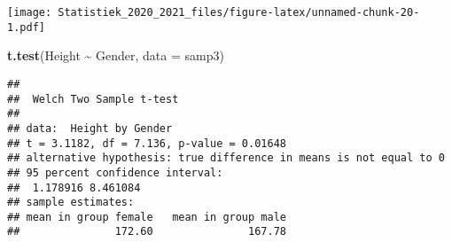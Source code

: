\documentclass[
  12pt,dutch,coursenotes]{book}
\newenvironment{Shaded}{\begin{snugshade}}{\end{snugshade}}
\newcommand{\DataTypeTok}[1]{\textcolor[rgb]{0.13,0.29,0.53}{#1}}
\newcommand{\DecValTok}[1]{\textcolor[rgb]{0.00,0.00,0.81}{#1}}
\newcommand{\KeywordTok}[1]{\textcolor[rgb]{0.13,0.29,0.53}{\textbf{#1}}}
\newcommand{\NormalTok}[1]{#1}
\newcommand{\OperatorTok}[1]{\textcolor[rgb]{0.81,0.36,0.00}{\textbf{#1}}}
\newcommand{\OtherTok}[1]{\textcolor[rgb]{0.56,0.35,0.01}{#1}}
\newcommand{\StringTok}[1]{\textcolor[rgb]{0.31,0.60,0.02}{#1}}
\theoremstyle{definition}
\theoremstyle{definition}
\theoremstyle{definition}
\theoremstyle{remark}
\begin{document}
\begin{Shaded}
\end{Shaded}

\texttt{[image: Statistiek\_2020\_2021\_files/figure-latex/unnamed-chunk-20-1.pdf]}

\begin{Shaded}
\begin{Highlighting}[]
\KeywordTok{t.test}\NormalTok{(Height }\OperatorTok{\textasciitilde{}}\StringTok{ }\NormalTok{Gender, }\DataTypeTok{data =}\NormalTok{ samp3)}
\end{Highlighting}
\end{Shaded}

\begin{verbatim}
## 
##  Welch Two Sample t-test
## 
## data:  Height by Gender
## t = 3.1182, df = 7.136, p-value = 0.01648
## alternative hypothesis: true difference in means is not equal to 0
## 95 percent confidence interval:
##  1.178916 8.461084
## sample estimates:
## mean in group female   mean in group male 
##               172.60               167.78
\end{verbatim}
\end{document}
